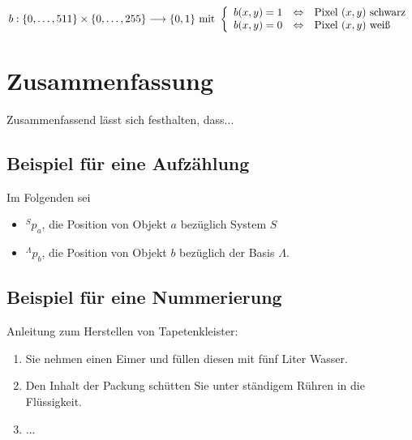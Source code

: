 \documentclass[german, 10pt]{report}
\begin{document}
\begin{equation}
    \left.
    b:\{0,\dots,511\}\times\{0,\dots,255\}\longrightarrow\{0,1\}\mbox{
    mit }\left\{
    \begin{array}{rcl}
        b(x,y)=1&\Leftrightarrow & \mbox{Pixel $(x,y)$ schwarz}\\
        b(x,y)=0\normalsize&\Leftrightarrow & \mbox{Pixel $(x,y)$ wei{\ss}}\\
    \end{array}
    \right.\right.\label{E_Bild}
\end{equation}


\chapter{Zusammenfassung}
\label{C_Zusammenfassung}Zusammenfassend l\"{a}sst sich festhalten,
dass...


\section{Beispiel f\"{u}r eine Aufz\"{a}hlung}
\label{S_Aufzaehlung}Im Folgenden sei
\begin{itemize}
    \item $^{S}p_{a}$, die Position von Objekt $a$ bez\"{u}glich System $S$
    \item $^{\Lambda}p_{b}$, die Position von Objekt $b$ bez\"{u}glich der Basis
    $\Lambda$.\\
\end{itemize}


\section{Beispiel f\"{u}r eine Nummerierung}
\label{S_Nummerierung}Anleitung zum Herstellen von Tapetenkleister:

\begin{enumerate}
    \item Sie nehmen einen Eimer und f\"{u}llen diesen mit f\"{u}nf Liter
    Wasser.
    \item Den Inhalt der Packung sch\"{u}tten Sie unter st\"{a}ndigem R\"{u}hren in die
    Fl\"{u}ssigkeit.
    \item ...\\
\end{enumerate}
\end{document}
